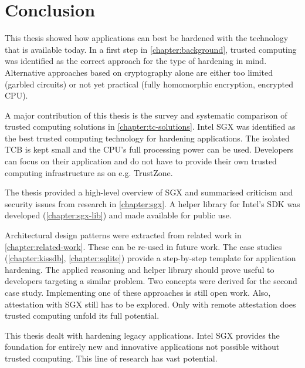 \chapter{Conclusion\label{ID_1572507625}}
This thesis showed how applications can best be hardened with the technology that is available today.\label{ID_1507977384}
In a first step in \autoref{chapter:background}, trusted computing was identified as the correct approach for the type of hardening in mind.\label{ID_580447740}
Alternative approaches based on cryptography alone are either too limited (garbled circuits) or not yet practical (fully homomorphic encryption, encrypted CPU).\label{ID_1382376198}

A major contribution of this thesis is the survey and systematic comparison of trusted computing solutions in \autoref{chapter:tc-solutions}.\label{ID_476358911}
Intel SGX was identified as the best trusted computing technology for hardening applications.\label{ID_1807939320}
The isolated TCB is kept small and the CPU's full processing power can be used.\label{ID_1660655171}
Developers can focus on their application and do not have to provide their own trusted computing infrastructure as on e.g. TrustZone.\label{ID_875938350}

The thesis provided a high-level overview of SGX and summarised criticism and security issues from research in \autoref{chapter:sgx}.\label{ID_517735378}
A helper library for Intel's SDK was developed (\autoref{chapter:sgx-lib}) and made available for public use.\label{ID_381101887}

Architectural design patterns were extracted from related work in \autoref{chapter:related-work}.\label{ID_151365644}
These can be re-used in future work.\label{ID_1282712103}
The case studies (\autoref{chapter:kissdb}, \autoref{chapter:sqlite}) provide a step-by-step template for application hardening.\label{ID_644003251}
The applied reasoning and helper library should prove useful to developers targeting a similar problem.\label{ID_680993229}
Two concepts were derived for the second case study.\label{ID_1182904330}
Implementing one of these approaches is still open work.\label{ID_709376890}
Also, attestation with SGX still has to be explored.\label{ID_34569373}
Only with remote attestation does trusted computing unfold its full potential.\label{ID_1633432001}

This thesis dealt with hardening legacy applications.\label{ID_1399326332}
Intel SGX provides the foundation for entirely new and innovative applications not possible without trusted computing.\label{ID_1610842511}
This line of research has vast potential.\label{ID_1792942181}

